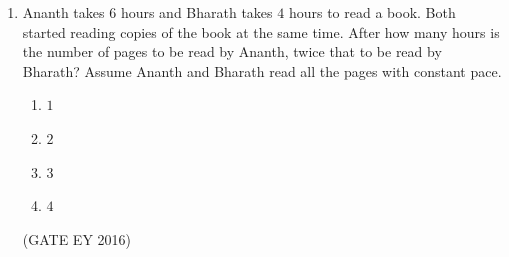 \documentclass[journal]{IEEEtran}
\begin{document}
\begin{enumerate}
\item Ananth takes $6$ hours and Bharath takes $4$ hours to read a book. Both started reading copies of the book at the same time. After how many hours is the number of pages to be read by Ananth, twice that to be read by Bharath? Assume Ananth and Bharath read all the pages with constant pace.
\begin{multicols}{4}
\begin{enumerate}
    \item $1$
    \item $2$
    \item $3$
    \item $4$
\end{enumerate}
\end{multicols}
\hfill{(GATE EY 2016)}

\end{enumerate}
\bigskip
{}

\clearpage
\end{document}
